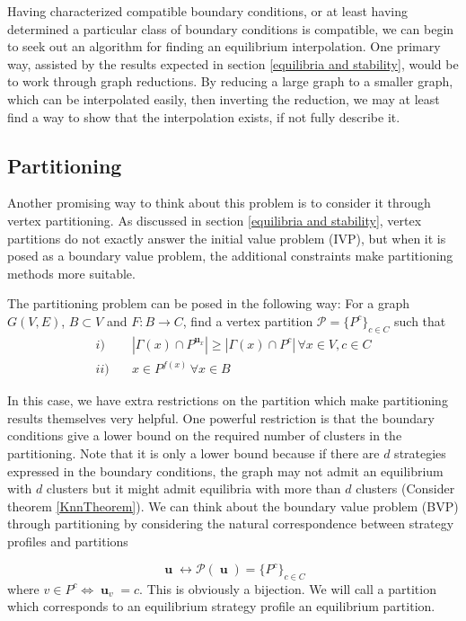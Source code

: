 \documentclass[]{article}
\DeclareMathOperator{\uu}{\mathbf{u}}
\begin{document}
		Having characterized compatible boundary conditions, or at least having determined a particular class of boundary conditions is compatible, we can begin to seek out an algorithm for finding an equilibrium interpolation. One primary way, assisted by the results expected in section \ref{equilibria and stability}, would be to work through graph reductions. By reducing a large graph to a smaller graph, which can be interpolated easily, then inverting the reduction, we may at least find a way to show that the interpolation exists, if not fully describe it.   
		\subsection{Partitioning}\label{partitioning}
		Another promising way to think about this problem is to consider it through vertex partitioning. As discussed in section \ref{equilibria and stability}, vertex partitions do not exactly answer the initial value problem (IVP), but when it is posed as a boundary value problem, the additional constraints make partitioning methods more suitable. 

		The partitioning problem can be posed in the following way: For a graph $G(V,E)$, $B\subset V$ and $F:B\rightarrow C$, find a vertex partition $\mathcal{P}=\{P^{c}\}_{c\in C}$ such that 
			\begin{equation}
				\begin{split}
					i)\quad & |\Gamma(x)\cap P^{\uu_x}|\geq |\Gamma(x)\cap P^{c}|\,\forall x\in V, c\in C \\
					ii)\quad &  x\in P^{f(x)}\,\forall x\in B 
				\end{split}
			\end{equation}
	
		In this case, we have extra restrictions on the partition which make partitioning results themselves very helpful. One powerful restriction is that the boundary conditions give a lower bound on the required number of clusters in the partitioning. Note that it is only a lower bound because if there are $d$ strategies expressed in the boundary conditions, the graph may not admit an equilibrium with $d$ clusters but it might admit equilibria with more than $d$ clusters (Consider theorem \ref{KnnTheorem}). We can think about the boundary value problem (BVP) through partitioning by considering the natural correspondence between strategy profiles and partitions
		
		\begin{equation}
			\uu \leftrightarrow \mathcal{P(\uu)}= \{P^c\}_{c\in C}
		\end{equation}
		where $v\in P^c \iff \uu_v=c$. This is obviously a bijection. We will call a partition which corresponds to an equilibrium strategy profile an equilibrium partition.  
		
\end{document}
